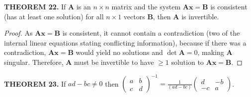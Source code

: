 \documentclass[12pt]{article}
\newcommand{\mat}[1]{\mathbf{#1}}
\newcommand{\theorem}[2]{\textbf{THEOREM #1.} #2}
\begin{document}
\theorem{22}{If $\mat{A}$ is an $n \times n$ matrix and the system $\mat{Ax} = \mat{B}$ is consistent (has at least one solution) for all $n \times 1$ vectors $\mat{B}$, then $\mat{A}$ is invertible.}

\begin{proof}
As $\mat{Ax=B}$ is consistent, it cannot contain a contradiction (two of the internal linear equations stating conflicting information), because if there was a contradiction, $\mat{Ax=B}$ would yield no solutions and $\det \mat{A} = 0$, making $\mat{A}$ singular. Therefore, $\mat{A}$ must be invertible to have $\ge 1$ solution to $\mat{Ax = B}$.  
\end{proof}

\theorem{23}{If $ad - bc \neq 0$ then $\begin{pmatrix} a & b \\ c & d \end{pmatrix}^{-1} = \frac{1}{(ad - bc)} \begin{pmatrix} d & -b \\ -c & a \end{pmatrix}$.}
\end{document}
